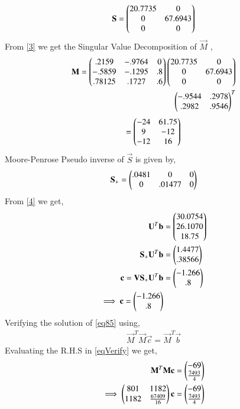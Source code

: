 \documentclass[journal,12pt,twocolumn]{IEEEtran}
\begin{document}
\begin{align}\label{eqS}
\mathbf{S}=\begin{pmatrix}20.7735&0\\0&67.6943\\0&0\end{pmatrix}
\end{align}
From \eqref{3} we get the Singular Value Decomposition of $\vec{M}$ ,
\begin{align}
\mathbf{M} = \begin{pmatrix}.2159&-.9764&0\\-.5859&-.1295&.8\\.78125&.1727&.6\end{pmatrix}\begin{pmatrix}20.7735&0\\0&67.6943\\0&0\end{pmatrix}\\\begin{pmatrix}-.9544&.2978\\.2982&.9546\end{pmatrix}^T
\end{align}
\begin{align}
=\begin{pmatrix}-24 & 61.75 \\ 9 & -12 \\ -12 & 16\end{pmatrix}    
\end{align}
Moore-Penrose Pseudo inverse of $\vec{S}$ is given by,
\begin{align}
\mathbf{S_+} = \begin{pmatrix}.0481&0&0\\0&.01477&0\end{pmatrix}
\end{align}
From \eqref{4} we get,
\begin{align}
\mathbf{U}^T\mathbf{b}&=\begin{pmatrix}30.0754\\26.1070\\18.75\end{pmatrix}\\
\mathbf{S_+}\mathbf{U}^T\mathbf{b}&=\begin{pmatrix}1.4477\\.38566\end{pmatrix}\\
\mathbf{c} = \mathbf{V}\mathbf{S_+}\mathbf{U}^T\mathbf{b} &= \begin{pmatrix}-1.266\\.8\end{pmatrix}\\
\implies\mathbf{c}=\begin{pmatrix}-1.266\\.8\end{pmatrix}\label{eq85}
\end{align}
Verifying the solution of \eqref{eq85} using,
\begin{align}
\vec{M}^T\vec{M}\vec{c} = \vec{M}^T\vec{b}\label{eqVerify}
\end{align}
Evaluating the R.H.S in \eqref{eqVerify} we get,
\begin{align}
\mathbf{M}^T\mathbf{M}\mathbf{c} &= \begin{pmatrix}-69\\\frac{7493}{4}\end{pmatrix}\\
\implies\begin{pmatrix}801&1182\\1182&\frac{67409}{16}\end{pmatrix}\mathbf{c} &= \begin{pmatrix}-69\\\frac{7493}{4}\end{pmatrix}\label{eq:eq17}
\end{align}
\end{document}
